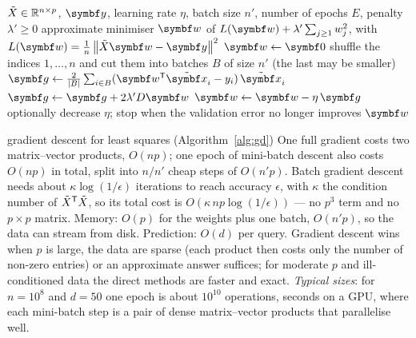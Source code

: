 \documentclass[11pt]{article}
\newcommand{\Xt}{\tilde X}
\newcommand{\xt}{\tilde{\x}}
\newcommand{\w}{\vect{w}}
\newcommand{\y}{\vect{y}}
\newcommand{\Ic}{D}
\begin{document}
\begin{algorithm}[htbp]
\caption{Least squares by mini-batch stochastic gradient descent}
\label{alg:gd}
\begin{algorithmic}[1]
\Require $\Xt \in \R^{n \times p}$, $\y$, learning rate $\eta$, batch size $n'$, number of epochs $E$, penalty $\lambda' \ge 0$
\Ensure approximate minimiser $\w$ of $L(\w) + \lambda'\sum_{j \ge 1} w_j^2$, with $L(\w) = \frac1n\norm{\Xt\w - \y}^2$
\State $\w \gets \vect{0}$ 
  \State shuffle the indices $1, \dots, n$ and cut them into batches $B$ of size $n'$ (the last may be smaller)
    \State $\vect{g} \gets \frac{2}{|B|}\sum_{i \in B} (\w\T\xt_i - y_i)\,\xt_i$ 
    \State $\vect{g} \gets \vect{g} + 2\lambda'\Ic\w$ \Comment{$\Ic = \mathrm{diag}(0, 1, \dots, 1)$; $\lambda' = 0$: least squares}
    \State $\w \gets \w - \eta\,\vect{g}$
  \EndFor
  \State optionally decrease $\eta$; stop when the validation error no longer improves
\EndFor
\State \Return $\w$
\end{algorithmic}
\end{algorithm}

\begin{runtime}{gradient descent for least squares (Algorithm~\ref{alg:gd})}
One full gradient costs two matrix--vector products, $O(np)$; one epoch of mini-batch descent also costs $O(np)$ in total,
split into $n/n'$ cheap steps of $O(n'p)$. Batch gradient descent needs about $\kappa\log(1/\epsilon)$ iterations to reach
accuracy $\epsilon$, with $\kappa$ the condition number of $\Xt\T\Xt$, so its total cost is $O(\kappa\,np\log(1/\epsilon))$
--- no $p^3$ term and no $p \times p$ matrix. Memory: $O(p)$ for the weights plus one batch, $O(n'p)$, so the data can
stream from disk. Prediction: $O(d)$ per query. Gradient descent wins when $p$ is large, the data are sparse (each
product then costs only the number of non-zero entries) or an approximate answer suffices; for moderate $p$ and
ill-conditioned data the direct methods are faster and exact. \emph{Typical sizes}: for $n = 10^8$ and $d = 50$ one epoch
is about $10^{10}$ operations, seconds on a GPU, where each mini-batch step is a pair of dense matrix--vector products
that parallelise well.
\end{runtime}
\end{document}
